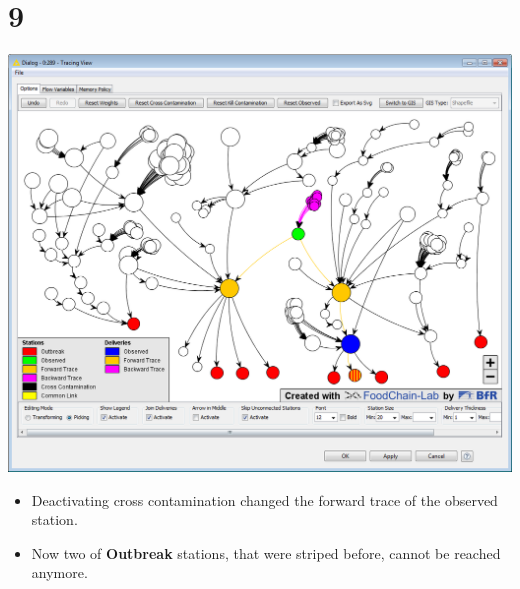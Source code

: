 \documentclass{beamer}
\begin{document}
\section{9}
\begin{frame}
	\begin{center}
  		\includegraphics[height=0.6\textheight]{9.png}
	\end{center}
	\begin{itemize}
		\item Deactivating cross contamination changed the forward trace of the observed station.
		\item Now two of \textbf{Outbreak} stations, that were striped before, cannot be reached anymore.
	\end{itemize}
\end{frame}
\end{document}
